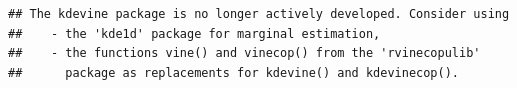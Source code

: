\documentclass[
]{article}
\newenvironment{Shaded}{\begin{snugshade}}{\end{snugshade}}
\newcommand{\ConstantTok}[1]{\textcolor[rgb]{0.56,0.35,0.01}{#1}}
\newcommand{\DecValTok}[1]{\textcolor[rgb]{0.00,0.00,0.81}{#1}}
\newcommand{\FunctionTok}[1]{\textcolor[rgb]{0.13,0.29,0.53}{\textbf{#1}}}
\newcommand{\NormalTok}[1]{#1}
\newcommand{\OtherTok}[1]{\textcolor[rgb]{0.56,0.35,0.01}{#1}}
\newcommand{\SpecialCharTok}[1]{\textcolor[rgb]{0.81,0.36,0.00}{\textbf{#1}}}
\begin{document}
\begin{verbatim}
## The kdevine package is no longer actively developed. Consider using 
##    - the 'kde1d' package for marginal estimation, 
##    - the functions vine() and vinecop() from the 'rvinecopulib' 
##      package as replacements for kdevine() and kdevinecop().
\end{verbatim}

\begin{Shaded}
\end{Shaded}
\end{document}
